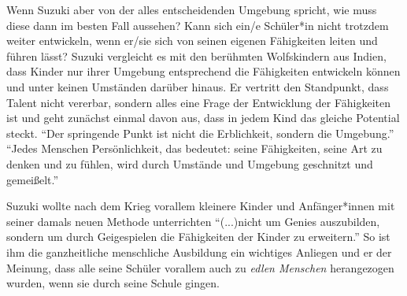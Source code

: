 Wenn Suzuki aber von der alles entscheidenden Umgebung spricht, wie muss diese
dann im besten Fall aussehen? Kann sich ein/e Schüler*in nicht trotzdem weiter
entwickeln, wenn er/sie sich von seinen eigenen Fähigkeiten leiten und führen lässt?
Suzuki vergleicht es mit den berühmten Wolfskindern aus Indien, dass Kinder nur
ihrer Umgebung entsprechend die Fähigkeiten entwickeln können und unter keinen
Umständen darüber hinaus. \autocite[24]{suzuki:erziehung_ist_liebe} Er vertritt
den Standpunkt, dass Talent nicht vererbar, sondern alles eine Frage der
Entwicklung der Fähigkeiten ist und geht zunächst einmal davon aus, dass in
jedem Kind das gleiche Potential steckt. \enquote{Der springende Punkt ist nicht
die Erblichkeit, sondern die Umgebung.}
\autocite[24]{suzuki:erziehung_ist_liebe} \enquote{Jedes Menschen
Persönlichkeit, das bedeutet: seine Fähigkeiten, seine Art zu denken und zu
fühlen, wird durch Umstände und Umgebung geschnitzt und gemeißelt.}
\autocite[20]{suzuki:erziehung_ist_liebe}

Suzuki wollte nach dem Krieg vorallem kleinere Kinder und Anfänger*innen mit
seiner damals neuen Methode unterrichten \enquote{(...)nicht um Genies
auszubilden, sondern um durch Geigespielen die Fähigkeiten der Kinder zu
erweitern.} \autocite[43]{suzuki:erziehung_ist_liebe} So ist ihm die
ganzheitliche menschliche Ausbildung ein wichtiges Anliegen und er der Meinung,
dass alle seine Schüler vorallem auch zu \emph{edlen Menschen} herangezogen
wurden, wenn sie durch seine Schule gingen. 










